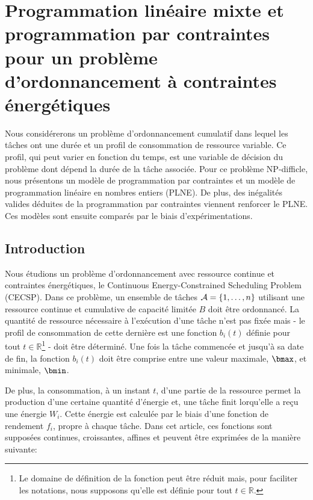 \chapter{Programmation linéaire mixte et programmation par contraintes
  pour un problème d'ordonnancement à contraintes énergétiques}  
\label{ann:JFPC}
Nous considérerons un problème d'ordonnancement cumulatif dans
lequel les tâches ont une durée et un profil de consommation de
ressource variable. Ce profil, qui peut varier en fonction du temps, est
une variable de décision du problème dont dépend la durée de la tâche
associée. 
Pour ce problème NP-difficle, nous présentons un modèle de programmation
par contraintes et un modèle de programmation linéaire en nombres
entiers (PLNE). De plus, des inégalités valides déduites de la
programmation par contraintes  viennent renforcer le PLNE. 
Ces modèles sont ensuite comparés par le biais d'expérimentations.


\section{Introduction}

Nous étudions un problème d’ordonnancement avec ressource continue et
contraintes énergétiques, le Continuous Energy-Constrained Scheduling
Problem (CECSP). Dans ce problème, un ensemble de tâches ${\cal
A}=\{1,\dots,n\}$ utilisant une ressource continue et cumulative de
capacité limitée $B$ doit être ordonnancé.  La quantité de ressource
nécessaire à l'exécution d'une tâche n'est pas fixée mais - le profil
de consommation de cette dernière est une fonction $b_i(t)$ définie
pour tout  $t \in \mathbb{R}$\footnote{Le domaine de définition de la
fonction peut être réduit mais, pour faciliter les notations, nous
supposons qu'elle est définie pour tout $t \in \mathbb{R}$.} - doit
être déterminé. Une fois la tâche commencée et jusqu'à sa date de fin,
la fonction $b_i(t)$ doit être comprise entre une valeur maximale,
$\bmax$, et minimale, $\bmin$.   

De plus, la consommation, à un instant $t$, d'une partie de
la ressource permet la production d'une certaine quantité d'énergie
et, une tâche finit lorqu'elle a reçu une énergie $W_i$. Cette
énergie est calculée par le biais d'une fonction de rendement $f_i$, 
propre à chaque tâche. Dans cet article, ces fonctions sont supposées
continues, croissantes, affines et peuvent être exprimées de la
manière suivante: 
 
